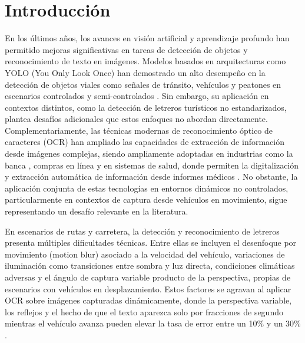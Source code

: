 \documentclass[runningheads]{llncs}
\begin{document}
\section{Introducción}
En los últimos años, los avances en visión artificial y aprendizaje
 profundo han permitido mejoras significativas en tareas de detección de 
 objetos y reconocimiento de texto en imágenes. Modelos basados en 
 arquitecturas como YOLO (You Only Look Once) han demostrado un alto
  desempeño en la detección de objetos viales como señales de tránsito, 
  vehículos y peatones en escenarios controlados y 
  semi-controlados \cite{articulo-trafico}. Sin embargo, su aplicación 
  en contextos distintos, como la detección de letreros turísticos no
   estandarizados, plantea desafíos adicionales que estos enfoques no 
   abordan directamente. Complementariamente, las técnicas modernas de 
   reconocimiento óptico de caracteres (OCR) han ampliado las capacidades
de extracción de información desde imágenes complejas, siendo ampliamente 
adoptadas en industrias como la banca \cite{ocr-banco}, compras en línea
 \cite{ocr-compras-en-linea} y en sistemas de salud, donde permiten 
 la digitalización y extracción automática de información desde informes 
 médicos \cite{ocr-salud}. No obstante, la aplicación conjunta de estas 
 tecnologías en entornos dinámicos no controlados, particularmente en 
 contextos de captura desde vehículos en movimiento, sigue representando 
 un desafío relevante en la literatura.

En escenarios de rutas y carretera, la detección y reconocimiento de 
letreros presenta múltiples dificultades técnicas. Entre ellas se incluyen
 el desenfoque por movimiento (motion blur) asociado a la velocidad del vehículo, 
 variaciones de iluminación como transiciones entre sombra y luz directa, 
 condiciones climáticas adversas y el ángulo de captura variable producto
  de la perspectiva, propias de escenarios con vehículos en 
  desplazamiento. Estos factores se agravan al aplicar OCR sobre imágenes 
  capturadas dinámicamente, donde la perspectiva variable, los reflejos 
  y el hecho de que el texto aparezca solo por fracciones de segundo
   mientras el vehículo avanza pueden elevar la tasa de error entre un 
   10\% y un 30\% \cite{mal-ocr-en-movimiento}.
\end{document}

